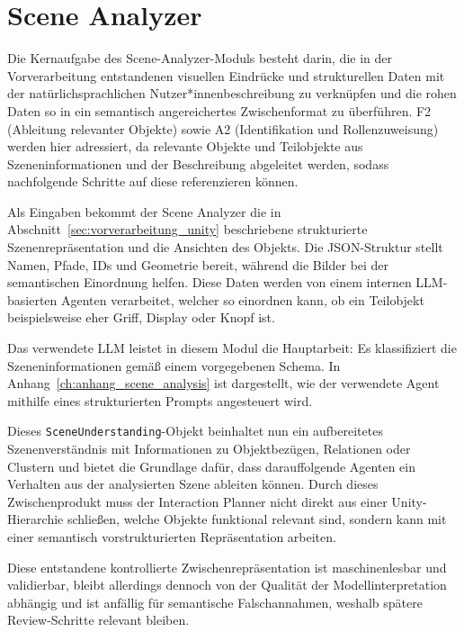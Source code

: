 \section{Scene Analyzer}\label{sec:scene_analyzer}


Die Kernaufgabe des Scene-Analyzer-Moduls besteht darin, die in der Vorverarbeitung entstandenen visuellen Eindrücke und strukturellen Daten mit der natürlichsprachlichen Nutzer*innenbeschreibung zu verknüpfen und die rohen Daten so in ein semantisch angereichertes Zwischenformat zu überführen. F2 (Ableitung relevanter Objekte) sowie A2 (Identifikation und Rollenzuweisung) werden hier adressiert, da relevante Objekte und Teilobjekte aus Szeneninformationen und der Beschreibung abgeleitet werden, sodass nachfolgende Schritte auf diese referenzieren können.

Als Eingaben bekommt der Scene Analyzer die in Abschnitt~\ref{sec:vorverarbeitung_unity} beschriebene strukturierte Szenenrepräsentation und die Ansichten des Objekts.
Die JSON-Struktur stellt Namen, Pfade, IDs und Geometrie bereit, während die Bilder bei der semantischen Einordnung helfen.
Diese Daten werden von einem internen LLM-basierten Agenten verarbeitet, welcher so einordnen kann, ob ein Teilobjekt beispielsweise eher Griff, Display oder Knopf ist.

Das verwendete LLM leistet in diesem Modul die Hauptarbeit: Es klassifiziert die Szeneninformationen gemäß einem vorgegebenen Schema.
In Anhang~\ref{ch:anhang_scene_analysis} ist dargestellt, wie der verwendete Agent mithilfe eines strukturierten Prompts angesteuert wird.

Dieses \texttt{SceneUnderstanding}-Objekt beinhaltet nun ein aufbereitetes Szenenverständnis mit Informationen zu Objektbezügen, Relationen oder Clustern und bietet die Grundlage dafür, dass darauffolgende Agenten ein Verhalten aus der analysierten Szene ableiten können. Durch dieses Zwischenprodukt muss der Interaction Planner nicht direkt aus einer Unity-Hierarchie schließen, welche Objekte funktional relevant sind, sondern kann mit einer semantisch vorstrukturierten Repräsentation arbeiten.

Diese entstandene kontrollierte Zwischenrepräsentation ist maschinenlesbar und validierbar, bleibt allerdings dennoch von der Qualität der Modellinterpretation abhängig und ist anfällig für semantische Falschannahmen, weshalb spätere Review-Schritte relevant bleiben.

